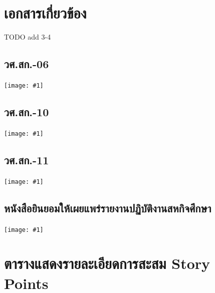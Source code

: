 \newcommand{\includepdfwithfirstpagefit}[1]{
    \texttt{[image: \#1]}
    
}

\newcommand{\includepdfwithonepage}[1]{
    \texttt{[image: \#1]}
}

\chapter{เอกสารเกี่ยวข้อง}

TODO add 3-4

\section{วศ.สก.-06}
\includepdfwithfirstpagefit{resources/bureaucrats/coop6.pdf}

\section{วศ.สก.-10}
\includepdfwithfirstpagefit{resources/bureaucrats/coop10.pdf}

\section{วศ.สก.-11}
\includepdfwithonepage{resources/bureaucrats/coop11.pdf}

\section{หนังสือยินยอมให้เผยแพร่รายงานปฏิบัติงานสหกิจศึกษา}
\includepdfwithonepage{resources/bureaucrats/publish-consent.pdf}

\chapter{ตารางแสดงรายละเอียดการสะสม Story Points}
